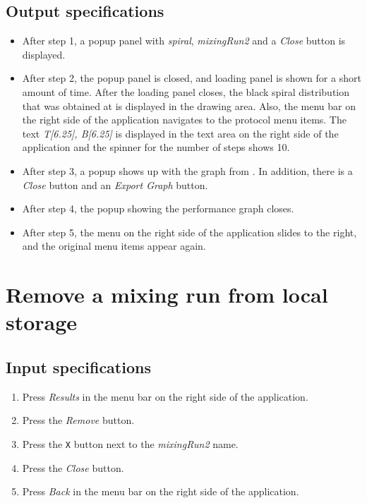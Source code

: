\subsection*{Output specifications}
\begin{itemize}
\item After step 1, a popup panel with \emph{spiral}, \emph{mixingRun2} and a \emph{Close} button is displayed.
\item After step 2, the popup panel is closed, and loading panel is shown for a short amount of time. After the loading panel closes, the black spiral distribution that was obtained at  is displayed in the drawing area. Also, the menu bar on the right side of the application navigates to the protocol menu items. The text \emph{T[6.25], B[6.25]} is displayed in the text area on the right side of the application and the spinner for the number of steps shows 10.
\item After step 3, a popup shows up with the graph from . In addition, there is a \emph{Close} button and an \emph{Export Graph} button.
\item After step 4, the popup showing the performance graph closes.
\item After step 5, the menu on the right side of the application slides to the right, and the original menu items appear again.
\end{itemize}

\section{Remove a mixing run from local storage}

\subsection*{Input specifications}
\begin{enumerate}
\item Press \emph{Results} in the menu bar on the right side of the application.
\item Press the \emph{Remove} button.
\item Press the \texttt{X} button next to the \emph{mixingRun2} name.
\item Press the \emph{Close} button.
\item Press \emph{Back} in the menu bar on the right side of the application.
\end{enumerate}

